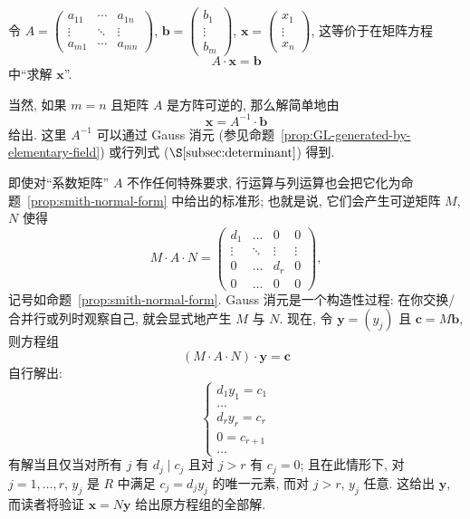 令 $A=\begin{pmatrix} a_{11}&\cdots&a_{1n}\\ \vdots&\ddots&\vdots\\ a_{m1}&\cdots&a_{mn}\end{pmatrix}$, $\mathbf{b}=\begin{pmatrix} b_1\\ \vdots\\ b_m\end{pmatrix}$, $\mathbf{x}=\begin{pmatrix} x_1\\ \vdots\\ x_n\end{pmatrix}$, 这等价于在矩阵方程
\[
A\cdot\mathbf{x}=\mathbf{b}
\]
中``求解 $\mathbf{x}$''.

当然, 如果 $m=n$ 且矩阵 $A$ 是方阵可逆的, 那么解简单地由
\[
\mathbf{x}=A^{-1}\cdot\mathbf{b}
\]
给出. 这里 $A^{-1}$ 可以通过 Gauss 消元 (参见命题~\ref{prop:GL-generated-by-elementary-field}) 或行列式 ($\S\ref{subsec:determinant}$) 得到.

即使对``系数矩阵'' $A$ 不作任何特殊要求, 行运算与列运算也会把它化为命题~\ref{prop:smith-normal-form} 中给出的标准形; 也就是说, 它们会产生可逆矩阵 $M$, $N$ 使得
\[
M\cdot A\cdot N=\begin{pmatrix} d_1&\dots&0&0\\ \vdots&\ddots&\vdots&\vdots\\ 0&\dots&d_r&0\\ \hline 0&\dots&0&0\end{pmatrix},
\]
记号如命题~\ref{prop:smith-normal-form}. Gauss 消元是一个构造性过程: 在你交换/合并行或列时观察自己, 就会显式地产生 $M$ 与 $N$. 现在, 令 $\mathbf{y}=(y_j)$ 且 $\mathbf{c}=M\mathbf{b}$, 则方程组
\[
(M\cdot A\cdot N)\cdot\mathbf{y}=\mathbf{c}
\]
自行解出:
\[
\left\{\begin{array}{c}
d_1y_1=c_1\\
\dots\\
d_ry_r=c_r\\
0=c_{r+1}\\
\dots
\end{array}\right.
\]
有解当且仅当对所有 $j$ 有 $d_j\mid c_j$ 且对 $j>r$ 有 $c_j=0$; 且在此情形下, 对 $j=1,\ldots,r$, $y_j$ 是 $R$ 中满足 $c_j = d_j y_j$ 的唯一元素, 而对 $j>r$, $y_j$ 任意. 这给出 $\mathbf{y}$, 而读者将验证 $\mathbf{x}=N\mathbf{y}$ 给出原方程组的全部解.

